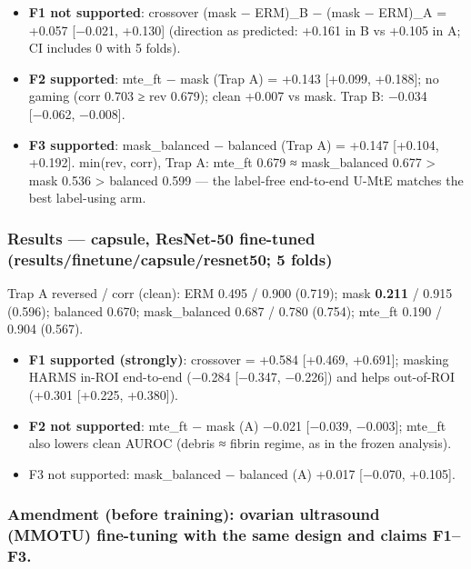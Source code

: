 {\begin{itemize}
\item
  \textbf{F1 not supported}: crossover (mask − ERM)\_B − (mask − ERM)\_A = +0.057 {[}−0.021, +0.130{]} (direction as
  predicted: +0.161 in B vs +0.105 in A; CI includes 0 with 5 folds).
\item
  \textbf{F2 supported}: mte\_ft − mask (Trap A) = +0.143 {[}+0.099, +0.188{]}; no gaming (corr 0.703 ≥ rev 0.679); clean
  +0.007 vs mask. Trap B: −0.034 {[}−0.062, −0.008{]}.
\item
  \textbf{F3 supported}: mask\_balanced − balanced (Trap A) = +0.147 {[}+0.104, +0.192{]}.
  min(rev, corr), Trap A: mte\_ft 0.679 ≈ mask\_balanced 0.677 \textgreater{} mask 0.536 \textgreater{} balanced 0.599 --- the label-free
  end-to-end U-MtE matches the best label-using arm.
\end{itemize}

\subsubsection{Results --- capsule, ResNet-50 fine-tuned (results/finetune/capsule/resnet50; 5 folds)}\label{results--capsule-resnet-50-fine-tuned-resultsfinetunecapsuleresnet50-5-folds}

Trap A reversed / corr (clean): ERM 0.495 / 0.900 (0.719); mask \textbf{0.211} / 0.915 (0.596); balanced 0.670;
mask\_balanced 0.687 / 0.780 (0.754); mte\_ft 0.190 / 0.904 (0.567).

\begin{itemize}

\item
  \textbf{F1 supported (strongly)}: crossover = +0.584 {[}+0.469, +0.691{]}; masking HARMS in-ROI end-to-end
  (−0.284 {[}−0.347, −0.226{]}) and helps out-of-ROI (+0.301 {[}+0.225, +0.380{]}).
\item
  \textbf{F2 not supported}: mte\_ft − mask (A) −0.021 {[}−0.039, −0.003{]}; mte\_ft also lowers clean AUROC (debris ≈ fibrin
  regime, as in the frozen analysis).
\item
  F3 not supported: mask\_balanced − balanced (A) +0.017 {[}−0.070, +0.105{]}.
\end{itemize}

\subsubsection{Amendment (before training): ovarian ultrasound (MMOTU) fine-tuning with the same design and claims F1--F3.}\label{amendment-before-training-ovarian-ultrasound-mmotu-fine-tuning-with-the-same-design-and-claims-f1f3}

}
